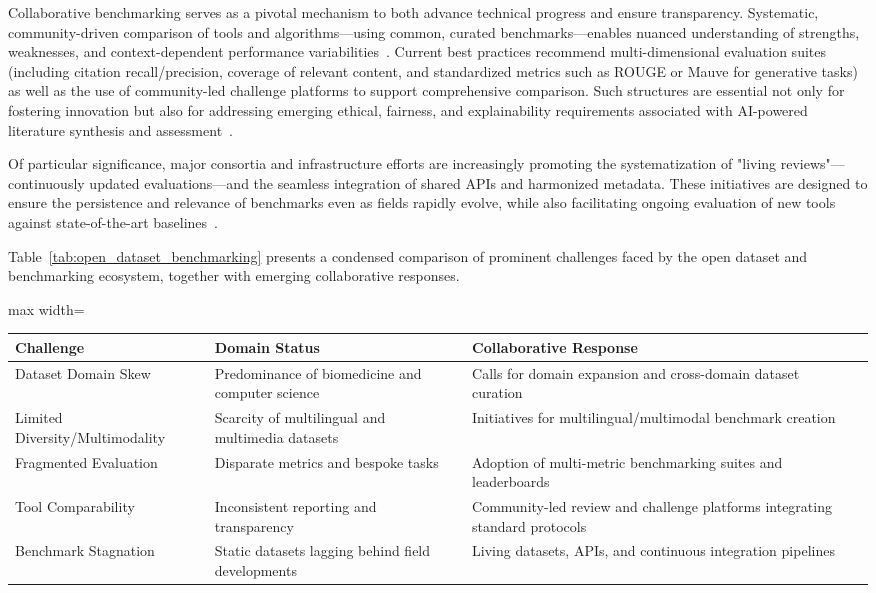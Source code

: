 Collaborative benchmarking serves as a pivotal mechanism to both advance technical progress and ensure transparency. Systematic, community-driven comparison of tools and algorithms—using common, curated benchmarks—enables nuanced understanding of strengths, weaknesses, and context-dependent performance variabilities~\cite{ref31,ref32,ref33,ref78,ref80,ref102,ref104,ref106}. Current best practices recommend multi-dimensional evaluation suites (including citation recall/precision, coverage of relevant content, and standardized metrics such as ROUGE or Mauve for generative tasks) as well as the use of community-led challenge platforms to support comprehensive comparison. Such structures are essential not only for fostering innovation but also for addressing emerging ethical, fairness, and explainability requirements associated with AI-powered literature synthesis and assessment~\cite{ref32,ref104,ref106,ref80,ref98}.

Of particular significance, major consortia and infrastructure efforts are increasingly promoting the systematization of "living reviews"—continuously updated evaluations—and the seamless integration of shared APIs and harmonized metadata. These initiatives are designed to ensure the persistence and relevance of benchmarks even as fields rapidly evolve, while also facilitating ongoing evaluation of new tools against state-of-the-art baselines~\cite{ref35,ref68,ref78,ref106}.

Table~\ref{tab:open_dataset_benchmarking} presents a condensed comparison of prominent challenges faced by the open dataset and benchmarking ecosystem, together with emerging collaborative responses.

\begin{table*}[htbp]
\centering
\caption{Key Challenges and Collaborative Responses in Open Datasets and Benchmarking}
\label{tab:open_dataset_benchmarking}
\begin{adjustbox}{max width=\textwidth}
\begin{tabular}{@{}llll@{}}
\toprule
\textbf{Challenge} & \textbf{Domain Status} & \textbf{Collaborative Response} &  \\ 
\midrule
Dataset Domain Skew & Predominance of biomedicine and computer science & Calls for domain expansion and cross-domain dataset curation &  \\
Limited Diversity/Multimodality & Scarcity of multilingual and multimedia datasets & Initiatives for multilingual/multimodal benchmark creation &  \\
Fragmented Evaluation & Disparate metrics and bespoke tasks & Adoption of multi-metric benchmarking suites and leaderboards &  \\
Tool Comparability & Inconsistent reporting and transparency & Community-led review and challenge platforms integrating standard protocols &  \\
Benchmark Stagnation & Static datasets lagging behind field developments & Living datasets, APIs, and continuous integration pipelines &  \\
\bottomrule
\end{tabular}
\end{adjustbox}
\end{table*}

